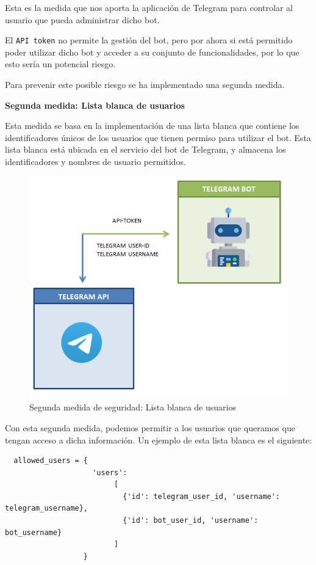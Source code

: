 Esta es la medida que nos aporta la aplicación de Telegram para controlar al usuario que pueda administrar dicho bot.

El \texttt{API token} no permite la gestión del bot, pero por ahora si está permitido poder utilizar dicho bot y acceder a su conjunto de funcionalidades, por lo que esto sería un potencial riesgo.

Para prevenir este posible riesgo se ha implementado una segunda medida.

\textbf{Segunda medida: Lista blanca de usuarios}

Esta medida se basa en la implementación de una lista blanca que contiene los identificadores únicos de los usuarios que tienen permiso para utilizar el bot. Esta lista blanca está ubicada en el servicio del bot de Telegram, y almacena los identificadores y nombres de usuario permitidos.

\begin{figure}[h]
	\centering
	\includegraphics[scale=0.5]{images/37}
	\caption{Segunda medida de seguridad: Lista blanca de usuarios}
	\label{img:seg2}
\end{figure}

Con esta segunda medida, podemos permitir a los usuarios que queramos que tengan acceso a dicha información. Un ejemplo de esta lista blanca es el siguiente:

\vspace{-0.5cm}

\begin{verbatim}
  allowed_users = {
  				    'users':
		                 [
		                   {'id': telegram_user_id, 'username': telegram_username}, 
		                   {'id': bot_user_id, 'username': bot_username}
		                 ]
	              }
\end{verbatim}

